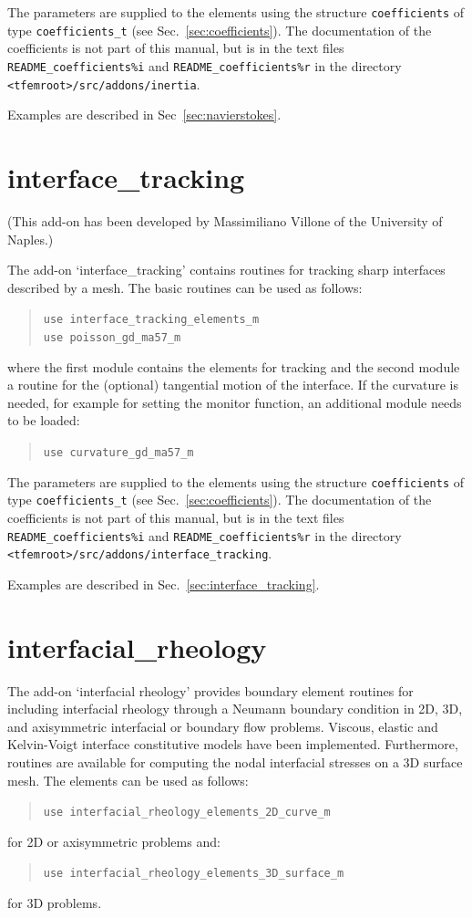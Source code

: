 The parameters are
supplied to the elements using the structure \texttt{coefficients} of type
\texttt{coefficients\_t} (see Sec.~\ref{sec:coefficients}). The documentation
of the coefficients is not part of this manual, but is in the text files
\texttt{README\_coefficients\%i} and
\texttt{README\_coefficients\%r} in the directory
\texttt{<tfemroot>/src/addons/inertia}.

Examples are described in Sec~\ref{sec:navierstokes}.

\section{interface\_tracking}
\label{sec:interfacetrackingaddon}

(This add-on has been developed by Massimiliano Villone of the University of
Naples.)

The add-on `interface\_tracking' contains routines for tracking
sharp interfaces described by a mesh.
The basic routines can be used as follows:
\begin{quote}
   \texttt{use interface\_tracking\_elements\_m}\\
   \texttt{use poisson\_gd\_ma57\_m}
\end{quote}
where the first module contains the elements for tracking and the second module
a routine for the (optional) tangential motion of the interface. If the curvature is needed, for example for setting
the monitor function, an additional module needs to be loaded:
\begin{quote}
   \texttt{use curvature\_gd\_ma57\_m}
\end{quote}

The parameters are
supplied to the elements using the structure \texttt{coefficients} of type
\texttt{coefficients\_t} (see Sec.~\ref{sec:coefficients}). The documentation
of the coefficients is not part of this manual, but is in the text files
\texttt{README\_coefficients\%i} and
\texttt{README\_coefficients\%r} in the directory
\texttt{<tfemroot>/src/addons/interface\_tracking}.

Examples are described in Sec.~\ref{sec:interface_tracking}.

\section{interfacial\_rheology}
\label{sec:int_rheo}
The add-on `interfacial rheology' provides boundary element routines for
including interfacial rheology through a Neumann boundary condition in 2D,
3D, and axisymmetric interfacial or boundary flow problems. Viscous, elastic
and Kelvin-Voigt interface constitutive models have been implemented.
Furthermore, routines are available for computing the nodal interfacial
stresses on a 3D surface mesh.
The elements can be used as follows:
\begin{quote}
   \texttt{use interfacial\_rheology\_elements\_2D\_curve\_m}
\end{quote}
for 2D or axisymmetric problems and:
\begin{quote}
   \texttt{use interfacial\_rheology\_elements\_3D\_surface\_m}
\end{quote}
for 3D problems.

